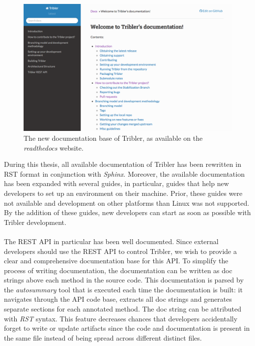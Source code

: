 \begin{figure}[h!]
	\centering
	\includegraphics[width=1.0\columnwidth]{images/improving_qa/readthedocs}
	\caption{The new documentation base of Tribler, as available on the \emph{readthedocs} website.}
	\label{fig:old-threading-model}
\end{figure}

During this thesis, all available documentation of Tribler has been rewritten in RST format in conjunction with \emph{Sphinx}. Moreover, the available documentation has been expanded with several guides, in particular, guides that help new developers to set up an environment on their machine. Prior, these guides were not available and development on other platforms than Linux was not supported. By the addition of these guides, new developers can start as soon as possible with Tribler development.\\\\
The REST API in particular has been well documented. Since external developers should use the REST API to control Tribler, we wish to provide a clear and comprehensive documentation base for this API. To simplify the process of writing documentation, the documentation can be written as doc strings above each method in the source code. This documentation is parsed by the \emph{autosummary} tool that is executed each time the documentation is built: it navigates through the API code base, extracts all doc strings and generates separate sections for each annotated method. The doc string can be attributed with \emph{RST} syntax. This feature decreases chances that developers accidentally forget to write or update artifacts since the code and documentation is present in the same file instead of being spread across different distinct files.

